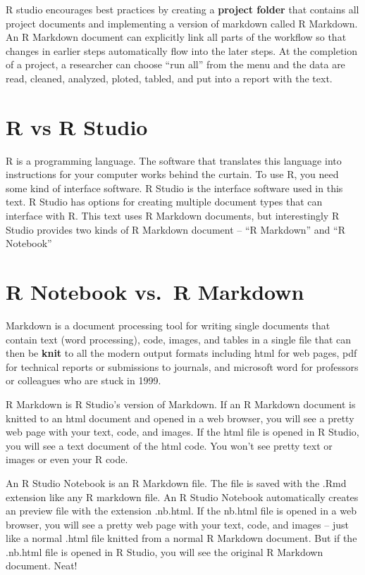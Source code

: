 \documentclass[]{book}
\begin{document}
R studio encourages best practices by creating a \textbf{project folder} that contains all project documents and implementing a version of markdown called R Markdown. An R Markdown document can explicitly link all parts of the workflow so that changes in earlier steps automatically flow into the later steps. At the completion of a project, a researcher can choose ``run all'' from the menu and the data are read, cleaned, analyzed, ploted, tabled, and put into a report with the text.

\hypertarget{r-vs-r-studio}{%
\section{R vs R Studio}\label{r-vs-r-studio}}

R is a programming language. The software that translates this language into instructions for your computer works behind the curtain. To use R, you need some kind of interface software. R Studio is the interface software used in this text. R Studio has options for creating multiple document types that can interface with R. This text uses R Markdown documents, but interestingly R Studio provides two kinds of R Markdown document -- ``R Markdown'' and ``R Notebook''

\hypertarget{r-notebook-vs.-r-markdown}{%
\section{R Notebook vs.~R Markdown}\label{r-notebook-vs.-r-markdown}}

Markdown is a document processing tool for writing single documents that contain text (word processing), code, images, and tables in a single file that can then be \textbf{knit} to all the modern output formats including html for web pages, pdf for technical reports or submissions to journals, and microsoft word for professors or colleagues who are stuck in 1999.

R Markdown is R Studio's version of Markdown. If an R Markdown document is knitted to an html document and opened in a web browser, you will see a pretty web page with your text, code, and images. If the html file is opened in R Studio, you will see a text document of the html code. You won't see pretty text or images or even your R code.

An R Studio Notebook is an R Markdown file. The file is saved with the .Rmd extension like any R markdown file. An R Studio Notebook automatically creates an preview file with the extension .nb.html. If the nb.html file is opened in a web browser, you will see a pretty web page with your text, code, and images -- just like a normal .html file knitted from a normal R Markdown document. But if the .nb.html file is opened in R Studio, you will see the original R Markdown document. Neat!
\end{document}
